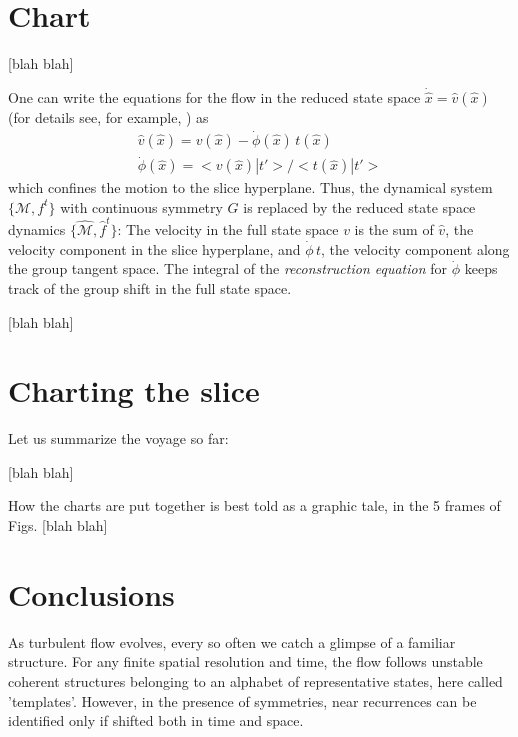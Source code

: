 \documentclass{article}
\begin{document}
\section{Chart}
\label{s:slice}

 [blah blah]

One can write the equations for the flow in the reduced state space
$\dot{\hat{x}} = \hat{v}(\hat{x})$ (for details see, for example,
\cite{DasBuch}) as
\begin{align}
\hat{v}(\hat{x}) = v(\hat{x})-\dot{\phi}(\hat{x}) \, t(\hat{x})
\label{2modesEqMotMFrame}\\
\dot{\phi}(\hat{x}) = <v(\hat{x})|t'>
                       /<t(\hat{x})|t'>
\label{2modesreconstrEq}
\end{align}
which confines the motion to the slice hyperplane. Thus, the dynamical
system $\{\mathcal{M},f^t\}$ with continuous symmetry $G$ is replaced by
the reduced state space dynamics $\{\hat{\mathcal{M}},\hat{f}^t\}$: The velocity in the
full state space $v$ is the sum of $\hat{v}$, the velocity component in
the slice hyperplane, and $\dot{\phi}\,t$, the velocity
component along the group tangent space. The integral of the {\em
reconstruction equation} for $\dot{\phi}$ keeps track of the group
shift in the full state space.


 [blah blah]

\section{Charting the slice}
\label{s:chart}

Let us summarize the voyage so far:

 [blah blah]


How the charts are put together is best told as a graphic tale, in the 5
frames of Figs.  [blah blah]



\section{Conclusions}
\label{s:concl}
As turbulent flow evolves, every so often we catch a glimpse of a
familiar structure. For any finite spatial resolution and time, the flow
follows unstable coherent structures belonging to an alphabet of
representative states, here called 'templates'. However, in the presence
of symmetries, near recurrences can be identified only if shifted both in
time and space.
\end{document}
